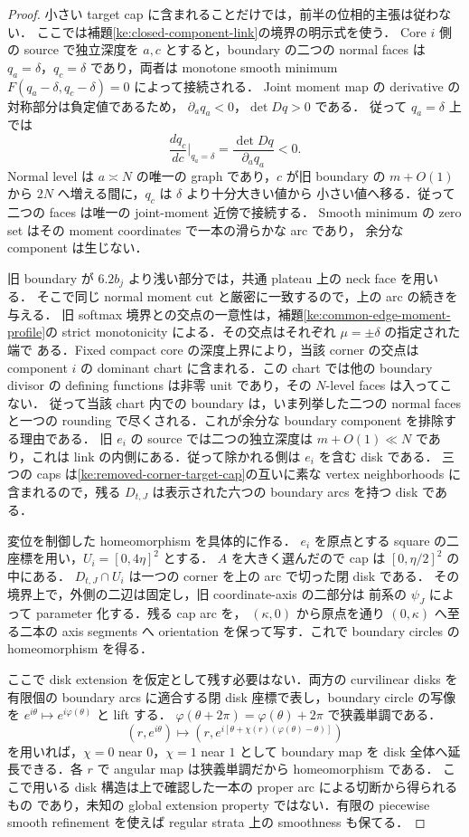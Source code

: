 \begin{proof}
小さい target cap に含まれることだけでは，前半の位相的主張は従わない．
ここでは補題\ref{ke:closed-component-link}の境界の明示式を使う．
Core $i$ 側の source で独立深度を $a,c$ とすると，boundary の二つの normal
faces は $q_a=\delta$，$q_c=\delta$ であり，両者は monotone smooth minimum
$F(q_a-\delta,q_c-\delta)=0$ によって接続される．
Joint moment map の derivative の対称部分は負定値であるため，
$\partial_aq_a<0$，$\det Dq>0$ である．
従って $q_a=\delta$ 上では
\[
 \frac{dq_c}{dc}\bigg|_{q_a=\delta}
 =\frac{\det Dq}{\partial_aq_a}<0.
\]
Normal level は $a\asymp N$ の唯一の graph であり，$c$ が旧 boundary の
$m+O(1)$ から $2N$ へ増える間に，$q_c$ は $\delta$ より十分大きい値から
小さい値へ移る．従って二つの faces は唯一の joint-moment 近傍で接続する．
Smooth minimum の zero set はその moment coordinates で一本の滑らかな arc であり，
余分な component は生じない．

旧 boundary が $6.2b_j$ より浅い部分では，共通 plateau 上の neck face を用いる．
そこで同じ normal moment cut と厳密に一致するので，上の arc の続きを与える．
旧 softmax 境界との交点の一意性は，補題\ref{ke:common-edge-moment-profile}の
strict monotonicity による．その交点はそれぞれ $\mu=\pm\delta$ の指定された端で
ある．Fixed compact core の深度上界により，当該 corner の交点は component $i$ の
dominant chart に含まれる．この chart では他の boundary divisor の defining
functions は非零 unit であり，その $N$-level faces は入ってこない．
従って当該 chart 内での boundary は，いま列挙した二つの normal faces と一つの
rounding で尽くされる．これが余分な boundary component を排除する理由である．
旧 $e_i$ の source では二つの独立深度は $m+O(1)\ll N$ であり，これは
link の内側にある．従って除かれる側は $e_i$ を含む disk である．
三つの caps は\ref{ke:removed-corner-target-cap}の互いに素な vertex neighborhoods
に含まれるので，残る $D_{t,J}$ は表示された六つの boundary arcs を持つ disk である．

変位を制御した homeomorphism を具体的に作る．
$e_i$ を原点とする square の二座標を用い，$U_i=[0,4\eta]^2$ とする．
$A$ を大きく選んだので cap は $[0,\eta/2]^2$ の中にある．
$D_{t,J}\cap U_i$ は一つの corner を上の arc で切った閉 disk である．
その境界上で，外側の二辺は固定し，旧 coordinate-axis の二部分は
前系の $\psi_J$ によって parameter 化する．残る cap arc を，
$(\kappa,0)$ から原点を通り $(0,\kappa)$ へ至る二本の axis segments へ
orientation を保って写す．これで boundary circles の homeomorphism を得る．

ここで disk extension を仮定として残す必要はない．両方の curvilinear disks を
有限個の boundary arcs に適合する閉 disk 座標で表し，boundary circle の写像を
$e^{i\theta}\mapsto e^{i\varphi(\theta)}$ と lift する．
$\varphi(\theta+2\pi)=\varphi(\theta)+2\pi$ で狭義単調である．
\[
 (r,e^{i\theta})\longmapsto
 \left(r,e^{i[\theta+\chi(r)(\varphi(\theta)-\theta)]}\right)
\]
を用いれば，$\chi=0$ near $0$，$\chi=1$ near $1$ として boundary map を disk
全体へ延長できる．各 $r$ で angular map は狭義単調だから homeomorphism である．
ここで用いる disk 構造は上で確認した一本の proper arc による切断から得られるもの
であり，未知の global extension property ではない．有限の piecewise smooth
refinement を使えば regular strata 上の smoothness も保てる．


\end{proof}

